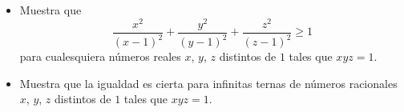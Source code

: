  \begin{itemize} 
 \item  Muestra que 
\[\frac {x^{2}}{\left(x - 1\right)^{2}} + \frac {y^{2}}{\left(y - 1\right)^{2}} + \frac {z^{2}}{\left(z - 1\right)^{2}} \geq 1\]
para cualesquiera números reales $x$, $y$, $z$ distintos de $1$ tales que $xyz=1$. 
 \item  Muestra que la igualdad es cierta para infinitas ternas de números racionales $x$, $y$, $z$ distintos de $1$ tales que $xyz=1$.
 \end{itemize} 

